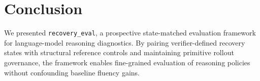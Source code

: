 \documentclass[conference]{IEEEtran}
\begin{document}
\section{Conclusion}
We presented \texttt{recovery\_eval}, a prospective state-matched evaluation framework for language-model reasoning diagnostics. By pairing verifier-defined recovery states with structural reference controls and maintaining primitive rollout governance, the framework enables fine-grained evaluation of reasoning policies without confounding baseline fluency gains.



\end{document}
